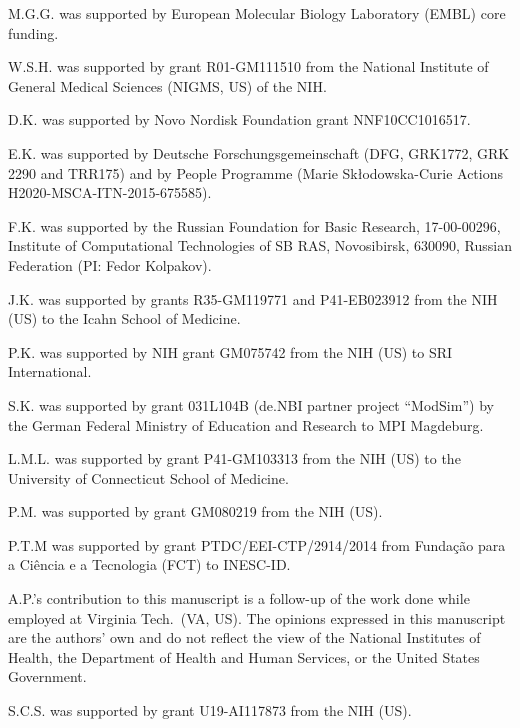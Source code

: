 \documentclass{sbml-paper}
\begin{document}
M.G.G. was supported by European Molecular Biology Laboratory (EMBL) core funding.

W.S.H. was supported by grant \No R01-GM111510 from the National Institute of General Medical Sciences (NIGMS, US) of the NIH.

D.K. was supported by Novo Nordisk Foundation grant \No NNF10CC1016517.

E.K. was supported by Deutsche Forschungsgemeinschaft (DFG, GRK1772, GRK 2290 and TRR175) and by People Programme (Marie Skłodowska-Curie Actions H2020-MSCA-ITN-2015-675585).

F.K. was supported by the Russian Foundation for Basic Research, 17-00-00296, Institute of Computational Technologies of SB RAS, Novosibirsk, 630090, Russian Federation (PI: Fedor Kolpakov).

J.K. was supported by grants \No R35-GM119771 and P41-EB023912 from the NIH (US) to the Icahn School of Medicine.

P.K. was supported by NIH grant \No GM075742 from the NIH (US) to SRI International.

S.K. was supported by grant \No 031L104B (de.NBI partner project ``ModSim'') by the German Federal Ministry of Education and Research to MPI Magdeburg.

L.M.L. was supported by grant \No P41-GM103313 from the NIH (US) to the University of Connecticut School of Medicine.

P.M. was supported by grant \No GM080219 from the NIH (US).

P.T.M was supported by grant \No PTDC/EEI-CTP/2914/2014 from Fundação para a Ciência e a Tecnologia (FCT) to INESC-ID.

A.P.'s contribution to this manuscript is a follow-up of the work done while employed at Virginia Tech.\ (VA, US). The opinions expressed in this manuscript are the authors' own and do not reflect the view of the National Institutes of Health, the Department of Health and Human Services, or the United States Government.

S.C.S. was supported by grant \No U19-AI117873 from the NIH (US).
\end{document}
